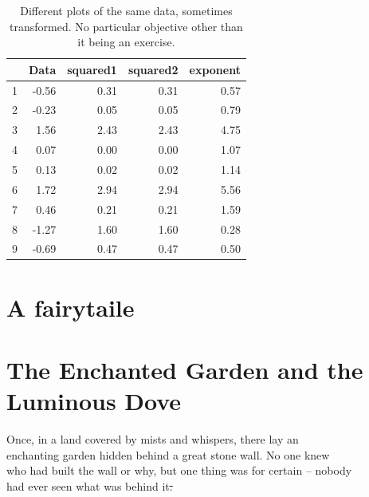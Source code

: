 \documentclass[12pt, a4paper, titlepage]{article}
\providecommand{\DIFdeltex}[1]{{\protect\color{red}\sout{#1}}} %
\providecommand{\DIFaddbegin}{} %
\providecommand{\DIFaddend}{} %
\providecommand{\DIFdelbegin}{} %
\providecommand{\DIFdelend}{} %
\providecommand{\DIFdelbeginFL}{} %
\providecommand{\DIFdelendFL}{} %
\providecommand{\DIFdel}[1]{\texorpdfstring{\DIFdeltex{#1}}{}} %
\providecommand{\DIFscaledelfig}{0.5}
\newlength{\DIFdelgraphicswidth} %
\newlength{\DIFdelgraphicsheight} %
\providecommand{\DIFaddincludegraphics}[2][]{{\color{blue}\fbox{\DIFOincludegraphics[#1]{#2}}}} %
\providecommand{\DIFdelincludegraphics}[2][]{%
\sbox{\DIFdelgraphicsbox}{\DIFOincludegraphics[#1]{#2}}%
\settoboxwidth{\DIFdelgraphicswidth}{\DIFdelgraphicsbox} %
\settoboxtotalheight{\DIFdelgraphicsheight}{\DIFdelgraphicsbox} %
\scalebox{\DIFscaledelfig}{%
\parbox[b]{\DIFdelgraphicswidth}{\usebox{\DIFdelgraphicsbox}\\[-\baselineskip] \rule{\DIFdelgraphicswidth}{0em}}\llap{\resizebox{\DIFdelgraphicswidth}{\DIFdelgraphicsheight}{%
\setlength{\unitlength}{\DIFdelgraphicswidth}%
\begin{picture}(1,1)%
\thicklines\linethickness{2pt} %
{\color[rgb]{1,0,0}\put(0,0){\framebox(1,1){}}}%
{\color[rgb]{1,0,0}\put(0,0){\line( 1,1){1}}}%
{\color[rgb]{1,0,0}\put(0,1){\line(1,-1){1}}}%
\end{picture}%
}\hspace*{3pt}}} %
} %
\DeclareRobustCommand{\DIFaddbegin}{\DIFOaddbegin \let\includegraphics\DIFaddincludegraphics} %
\DeclareRobustCommand{\DIFaddend}{\DIFOaddend \let\includegraphics\DIFOincludegraphics} %
\DeclareRobustCommand{\DIFdelbegin}{\DIFOdelbegin \let\includegraphics\DIFdelincludegraphics} %
\DeclareRobustCommand{\DIFdelend}{\DIFOaddend \let\includegraphics\DIFOincludegraphics} %
\DeclareRobustCommand{\DIFdelbeginFL}{\DIFOdelbeginFL \let\includegraphics\DIFdelincludegraphics} %
\DeclareRobustCommand{\DIFdelendFL}{\DIFOaddendFL \let\includegraphics\DIFOincludegraphics} %
\begin{document}
\vspace{0.5cm}


\begin{table}[H]
  \centering
  \DIFdelbeginFL %

  \DIFdelendFL \caption{Different plots of the same data, sometimes transformed. No particular objective 
other than it being an exercise.}



\begin{tabular}{lrrrr}
  \hline
   & Data & squared1 & squared2 & exponent\\ 
  \hline
  1           & -0.56 & 0.31 & 0.31 & 0.57\\ 
  2           & -0.23 & 0.05 & 0.05 & 0.79\\ 
  3           & 1.56 & 2.43 & 2.43 & 4.75 \\ 
  4           & 0.07 & 0.00 & 0.00 & 1.07 \\ 
  5           & 0.13 & 0.02 & 0.02 & 1.14  \\ 
  6           & 1.72 & 2.94 & 2.94 & 5.56 \\ 
  7           & 0.46 & 0.21 & 0.21 & 1.59 \\ 
  8           & -1.27 & 1.60 & 1.60 & 0.28\\
  9           & -0.69 & 0.47 & 0.47 & 0.50\\ 
   \hline
  \end{tabular}
\end{table}




\section{A fairytaile}
\section*{The Enchanted Garden and the Luminous Dove}

Once, in a land covered by mists and whispers, there lay an\\ 
enchanting garden hidden behind a great stone wall. \DIFdelbegin %
\DIFdelend No one knew\DIFaddbegin \\
\DIFaddend who had built the wall or why, but one thing was \DIFdelbegin %
\DIFdelend for certain – nobody\DIFaddbegin \\ 
\DIFaddend had ever seen what was behind it\DIFdelbegin \DIFdel{.}\DIFdelend \\
\end{document}
